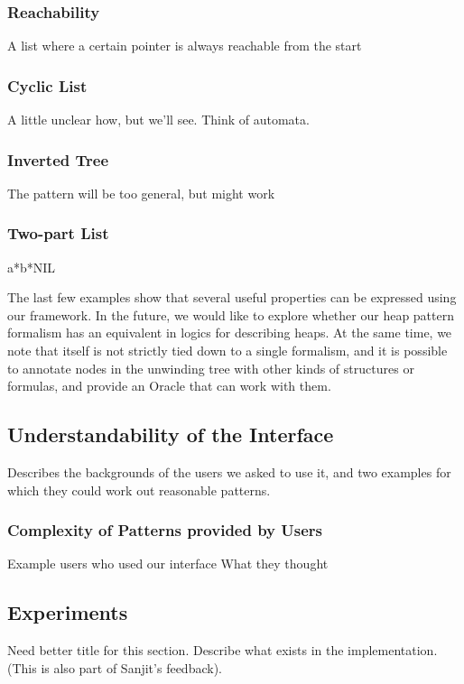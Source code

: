 \subsubsection{Reachability}
A list where a certain pointer is always reachable from the start

\subsubsection{Cyclic List}
A little unclear how, but we'll see. Think of automata.

\subsubsection{Inverted Tree}
The pattern will be too general, but might work

\subsubsection{Two-part List}
a*b*NIL

The last few examples show that several useful properties can be expressed using our framework. In the future, we would like to explore whether our heap pattern formalism has an equivalent in logics for describing heaps. At the same time, we note that \verifier itself is not strictly tied down to a single formalism, and it is possible to annotate nodes in the unwinding tree with other kinds of structures or formulas, and provide an Oracle that can work with them.

\subsection{Understandability of the Interface}
\label{sec:understandability-of-interface}
Describes the backgrounds of the users we asked to use it, and two examples for which they could work out reasonable patterns.

\subsubsection{Complexity of Patterns provided by Users}
Example users who used our interface
What they thought

\subsection{Experiments}
Need better title for this section. Describe what exists in the implementation. (This is also part of Sanjit's feedback).

